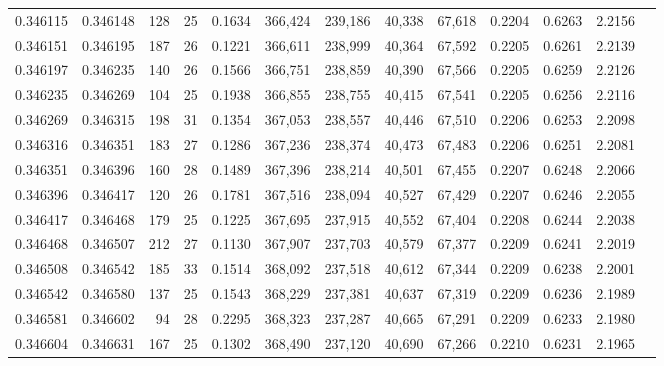\begin{tabular}{rrrrrrrrrrrrr}
0.346115 & 0.346148 &   128 &  25 &                                     0.1634 & 366,424 & 239,186 &  40,338 &  67,618 & 0.2204 & 0.6263 & 2.2156 \\
0.346151 & 0.346195 &   187 &  26 &                                     0.1221 & 366,611 & 238,999 &  40,364 &  67,592 & 0.2205 & 0.6261 & 2.2139 \\
0.346197 & 0.346235 &   140 &  26 &                                     0.1566 & 366,751 & 238,859 &  40,390 &  67,566 & 0.2205 & 0.6259 & 2.2126 \\
0.346235 & 0.346269 &   104 &  25 &                                     0.1938 & 366,855 & 238,755 &  40,415 &  67,541 & 0.2205 & 0.6256 & 2.2116 \\
0.346269 & 0.346315 &   198 &  31 &                                     0.1354 & 367,053 & 238,557 &  40,446 &  67,510 & 0.2206 & 0.6253 & 2.2098 \\
0.346316 & 0.346351 &   183 &  27 &                                     0.1286 & 367,236 & 238,374 &  40,473 &  67,483 & 0.2206 & 0.6251 & 2.2081 \\
0.346351 & 0.346396 &   160 &  28 &                                     0.1489 & 367,396 & 238,214 &  40,501 &  67,455 & 0.2207 & 0.6248 & 2.2066 \\
0.346396 & 0.346417 &   120 &  26 &                                     0.1781 & 367,516 & 238,094 &  40,527 &  67,429 & 0.2207 & 0.6246 & 2.2055 \\
0.346417 & 0.346468 &   179 &  25 &                                     0.1225 & 367,695 & 237,915 &  40,552 &  67,404 & 0.2208 & 0.6244 & 2.2038 \\
0.346468 & 0.346507 &   212 &  27 &                                     0.1130 & 367,907 & 237,703 &  40,579 &  67,377 & 0.2209 & 0.6241 & 2.2019 \\
0.346508 & 0.346542 &   185 &  33 &                                     0.1514 & 368,092 & 237,518 &  40,612 &  67,344 & 0.2209 & 0.6238 & 2.2001 \\
0.346542 & 0.346580 &   137 &  25 &                                     0.1543 & 368,229 & 237,381 &  40,637 &  67,319 & 0.2209 & 0.6236 & 2.1989 \\
0.346581 & 0.346602 &    94 &  28 &                                     0.2295 & 368,323 & 237,287 &  40,665 &  67,291 & 0.2209 & 0.6233 & 2.1980 \\
0.346604 & 0.346631 &   167 &  25 &                                     0.1302 & 368,490 & 237,120 &  40,690 &  67,266 & 0.2210 & 0.6231 & 2.1965 \\

\end{tabular}
